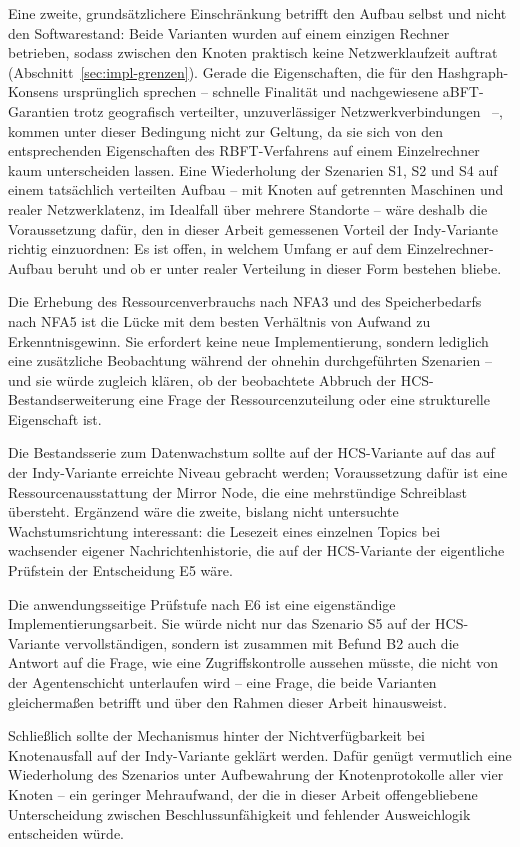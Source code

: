 Eine zweite, grundsätzlichere Einschränkung betrifft den Aufbau selbst und nicht den Softwarestand: Beide Varianten wurden auf einem einzigen Rechner betrieben, sodass zwischen den Knoten praktisch keine Netzwerklaufzeit auftrat (Abschnitt~\ref{sec:impl-grenzen}). Gerade die Eigenschaften, die für den Hashgraph-Konsens ursprünglich sprechen -- schnelle Finalität und nachgewiesene aBFT-Garantien trotz geografisch verteilter, unzuverlässiger Netzwerkverbindungen~\cite{baird2016,bairdharmon2019} --, kommen unter dieser Bedingung nicht zur Geltung, da sie sich von den entsprechenden Eigenschaften des RBFT-Verfahrens auf einem Einzelrechner kaum unterscheiden lassen. Eine Wiederholung der Szenarien S1, S2 und S4 auf einem tatsächlich verteilten Aufbau -- mit Knoten auf getrennten Maschinen und realer Netzwerklatenz, im Idealfall über mehrere Standorte -- wäre deshalb die Voraussetzung dafür, den in dieser Arbeit gemessenen Vorteil der Indy-Variante richtig einzuordnen: Es ist offen, in welchem Umfang er auf dem Einzelrechner-Aufbau beruht und ob er unter realer Verteilung in dieser Form bestehen bliebe.

Die Erhebung des Ressourcenverbrauchs nach NFA3 und des Speicherbedarfs nach NFA5 ist die Lücke mit dem besten Verhältnis von Aufwand zu Erkenntnisgewinn. Sie erfordert keine neue Implementierung, sondern lediglich eine zusätzliche Beobachtung während der ohnehin durchgeführten Szenarien -- und sie würde zugleich klären, ob der beobachtete Abbruch der HCS-Bestandserweiterung eine Frage der Ressourcenzuteilung oder eine strukturelle Eigenschaft ist.

Die Bestandsserie zum Datenwachstum sollte auf der HCS-Variante auf das auf der Indy-Variante erreichte Niveau gebracht werden; Voraussetzung dafür ist eine Ressourcenausstattung der Mirror Node, die eine mehrstündige Schreiblast übersteht. Ergänzend wäre die zweite, bislang nicht untersuchte Wachstumsrichtung interessant: die Lesezeit eines einzelnen Topics bei wachsender eigener Nachrichtenhistorie, die auf der HCS-Variante der eigentliche Prüfstein der Entscheidung E5 wäre.

Die anwendungsseitige Prüfstufe nach E6 ist eine eigenständige Implementierungsarbeit. Sie würde nicht nur das Szenario S5 auf der HCS-Variante vervollständigen, sondern ist zusammen mit Befund B2 auch die Antwort auf die Frage, wie eine Zugriffskontrolle aussehen müsste, die nicht von der Agentenschicht unterlaufen wird -- eine Frage, die beide Varianten gleichermaßen betrifft und über den Rahmen dieser Arbeit hinausweist.

Schließlich sollte der Mechanismus hinter der Nichtverfügbarkeit bei Knotenausfall auf der Indy-Variante geklärt werden. Dafür genügt vermutlich eine Wiederholung des Szenarios unter Aufbewahrung der Knotenprotokolle aller vier Knoten -- ein geringer Mehraufwand, der die in dieser Arbeit offengebliebene Unterscheidung zwischen Beschlussunfähigkeit und fehlender Ausweichlogik entscheiden würde.